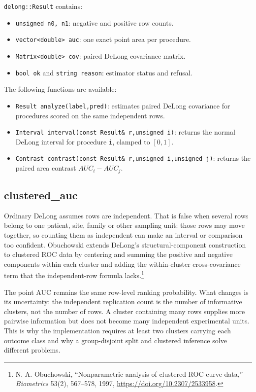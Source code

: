 \texttt{delong::Result} contains:

\begin{itemize}
\item \texttt{unsigned n0, n1}: negative and positive row counts.
\item \texttt{vector<double> auc}: one exact point area per procedure.
\item \texttt{Matrix<double> cov}: paired DeLong covariance matrix.
\item \texttt{bool ok} and \texttt{string reason}: estimator status and refusal.
\end{itemize}

The following functions are available:

\begin{itemize}
\item \texttt{Result analyze(label,pred)}: estimates paired DeLong covariance
      for procedures scored on the same independent rows.
\item \texttt{Interval interval(const Result\& r,unsigned i)}: returns the
      normal DeLong interval for procedure \texttt{i}, clamped to $[0,1]$.
\item \texttt{Contrast contrast(const Result\& r,unsigned i,unsigned j)}:
      returns the paired area contrast $AUC_i-AUC_j$.
\end{itemize}

\subsection{clustered\_auc}
Ordinary DeLong assumes rows are independent.  That is false when several rows
belong to one patient, site, family or other sampling unit: those rows may move
together, so counting them as independent can make an interval or comparison
too confident.  Obuchowski extends DeLong's structural-component construction
to clustered ROC data by centering and summing the positive and negative
components within each cluster and adding the within-cluster cross-covariance
term that the independent-row formula lacks.\footnote{N. A. Obuchowski,
``Nonparametric analysis of clustered ROC curve data,'' \emph{Biometrics}
53(2), 567--578, 1997, \url{https://doi.org/10.2307/2533958}.}

The point AUC remains the same row-level ranking probability.  What changes is
its uncertainty: the independent replication count is the number of informative
clusters, not the number of rows.  A cluster containing many rows supplies more
pairwise information but does not become many independent experimental units.
This is why the implementation requires at least two clusters carrying each
outcome class and why a group-disjoint split and clustered inference solve
different problems.

